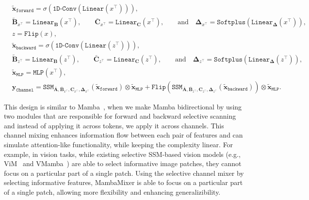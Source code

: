 \documentclass{article}
\begin{document}
\begin{align}
    &\tilde{\mathbf{x}}_{\texttt{forward}} = \sigma\left( \texttt{1D-Conv}\left( \texttt{Linear}\left( x^{\top} \right) \right) \right), \\
    &\tilde{\mathbf{B}}_{x^{\top}} = \texttt{Linear}_{\textbf{B}}(x^{\top}), \qquad \bar{\mathbf{C}}_{x^{\top}} = \texttt{Linear}_{\textbf{C}}(x^{\top}), \qquad \text{and} \quad \boldsymbol{\Delta}_{x^{\top}} = \texttt{Softplus}\left(\texttt{Linear}_{\boldsymbol{\Delta}}(x^{\top})\right),\\
    &z = \texttt{Flip}\left( x \right),\\
    &\tilde{\mathbf{x}}_{\texttt{backward}} = \sigma\left( \texttt{1D-Conv}\left( \texttt{Linear}\left( z^{\top} \right) \right) \right), \\
    &\tilde{\mathbf{B}}_{z^{\top}} = \texttt{Linear}_{\textbf{B}}(z^{\top}), \qquad \bar{\mathbf{C}}_{z^{\top}} = \texttt{Linear}_{\textbf{C}}(z^{\top}), \qquad \text{and} \quad \boldsymbol{\Delta}_{z^{\top}} = \texttt{Softplus}\left(\texttt{Linear}_{\boldsymbol{\Delta}}(z^{\top})\right),\\
    &\tilde{\mathbf{x}}_{\texttt{MLP}} = \texttt{MLP}\left( x^{\top} \right), \\
    &\mathbf{y}_{\texttt{Channel}} = \texttt{SSM}_{\bar{\mathbf{A}}, \bar{\mathbf{B}}_{x^{\top}}, {\mathbf{C}_{x^{\top}}}, \boldsymbol{\Delta}_{x^{\top}}}\left( \tilde{\mathbf{x}}_{\texttt{forward}} \right) \otimes \tilde{\mathbf{x}}_{\texttt{MLP}} + \texttt{Flip}\left(\texttt{SSM}_{\bar{\mathbf{A}}, \bar{\mathbf{B}}_{z^{\top}}, {\mathbf{C}_{z^{\top}}}, \boldsymbol{\Delta}_{z^{\top}}}\left( \tilde{\mathbf{x}}_{\texttt{backward}} \right)\right) \otimes \tilde{\mathbf{x}}_{\texttt{MLP}}. 
\end{align}

This design is similar to Mamba~\citep{gu2023mamba}, when we make Mamba bidirectional by using two modules that are responsible for forward and backward selective scanning and instead of applying it across tokens, we apply it across channels. This channel mixing enhances information flow between each pair of features and can simulate attention-like functionality, while keeping the complexity linear. For example, in vision tasks, while existing selective SSM-based vision models (e.g., ViM~\citep{zhu2024ViM} and VMamba~\citep{liu2024vmamba}) are able to select informative image patches, they cannot focus on a particular part of a single patch. Using the selective channel mixer by selecting informative features, MambaMixer is able to focus on a particular part of a single patch, allowing more flexibility and enhancing generalizibility. 
\end{document}
